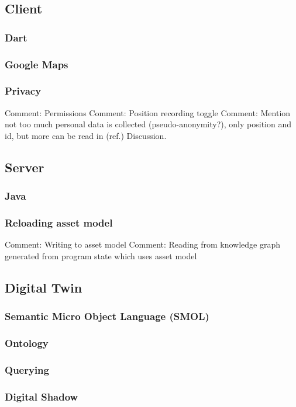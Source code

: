 \documentclass{article}
\begin{document}
\subsection{Client}
\subsubsection{Dart}
\subsubsection{Google Maps}
\subsubsection{Privacy}
Comment: Permissions
Comment: Position recording toggle
Comment: Mention not too much personal data is collected (pseudo-anonymity?), only position and id, but more can be read in (ref.) Discussion.

\subsection{Server}
\subsubsection{Java}
\subsubsection{Reloading asset model}
Comment: Writing to asset model
Comment: Reading from knowledge graph generated from program state which uses asset model


\subsection{Digital Twin}
\subsubsection{Semantic Micro Object Language (SMOL)}
\subsubsection{Ontology}
\subsubsection{Querying}
\subsubsection{Digital Shadow}
\end{document}
